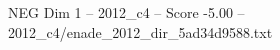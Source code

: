 \begin{textsample}{NEG Dim 1 – 2012\_c4 – Score -5.00 – 2012\_c4/enade\_2012\_dir\_5ad34d9588.txt}
\end{textsample}
